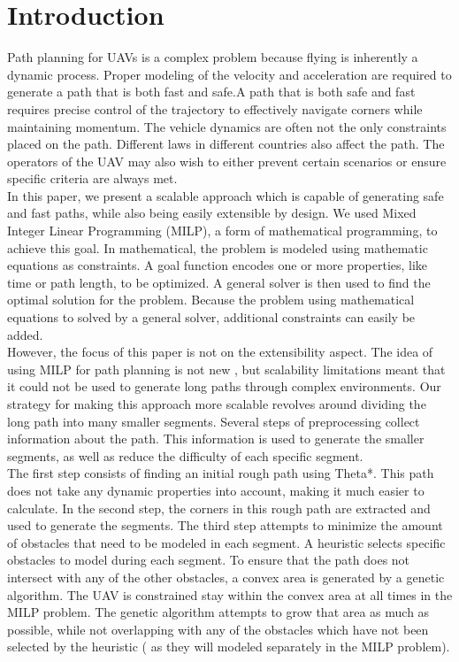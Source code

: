 \section{Introduction}
Path planning for UAVs is a complex problem because flying is inherently a dynamic process. Proper modeling of the velocity and acceleration are required to generate a path that is both fast and safe.A path that is both safe and fast requires precise control of the trajectory to effectively navigate corners while maintaining momentum. The vehicle dynamics are often not the only constraints placed on the path. Different laws in different countries also affect the path. The operators of the UAV may also wish to either prevent certain scenarios or ensure specific criteria are always met. \\
In this paper, we present a scalable approach which is capable of generating safe and fast paths, while also being easily extensible by design. We used Mixed Integer Linear Programming (MILP), a form of mathematical programming, to achieve this goal. In mathematical, the problem is modeled using mathematic equations as constraints. A goal function encodes one or more properties, like time or path length, to be optimized. A general solver is then used to find the optimal solution for the problem. Because the problem using mathematical equations to solved by a general solver, additional constraints can easily be added.\\
However, the focus of this paper is not on the extensibility aspect. The idea of using MILP for path planning is not new \cite{Schouwenaars2001}, but scalability limitations meant that it could not be used to generate long paths through complex environments. Our strategy for making this approach more scalable revolves around dividing the long path into many smaller segments. Several steps of preprocessing collect information about the path. This information is used to generate the smaller segments, as well as reduce the difficulty of each specific segment. \\
The first step consists of finding an initial rough path using Theta*. This path does not take any dynamic properties into account, making it much easier to calculate. In the second step, the corners in this rough path are extracted and used to generate the segments. The third step attempts to minimize the amount of obstacles that need to be modeled in each segment. A heuristic selects specific obstacles to model during each segment. To ensure that the path does not intersect with any of the other obstacles, a convex area is generated by a genetic algorithm. The UAV is constrained stay within the convex area at all times in the MILP problem.  The genetic algorithm attempts to grow that area as much as possible, while not overlapping with any of the obstacles which have not been selected by the heuristic ( as they will modeled separately in the MILP problem).

